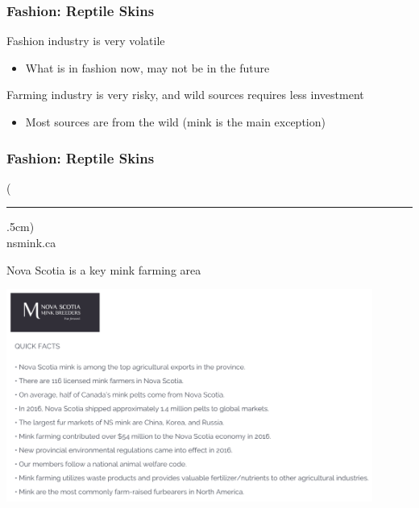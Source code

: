 \documentclass[10pt]{beamer}
\newenvironment{reference}[2]{%
	\begin{textblock*}{\textwidth}(#1,#2)
		\tiny\bgroup\color{gray}}{\egroup\end{textblock*}}
\begin{document}
\begin{frame}[t]
\frametitle{Fashion: Reptile Skins}
\vspace{0.5cm}

	Fashion industry is very volatile\\
	\medskip
		\begin{itemize}
			\item What is in fashion now, may not be in the future\\
		\end{itemize}
	
	\vspace{0.4cm}
	
	Farming industry is very risky, and wild sources requires less investment\\
	\medskip
		\begin{itemize}
			\item Most sources are from the wild (mink is the main exception)
		\end{itemize}			
\end{frame}


\begin{frame}[t]
\frametitle{Fashion: Reptile Skins}
\vspace{0.5cm}

	\begin{reference}{4mm}{92mm}
		\rule{1.5cm}{0.25pt}\\
		nsmink.ca\\
	\end{reference}

	Nova Scotia is a key mink farming area\\
	
	\vspace{0.5cm}
	
	\begin{center}
		\includegraphics[width=0.9\textwidth]{figures/mink.png}
	\end{center}
\end{frame}
\end{document}
